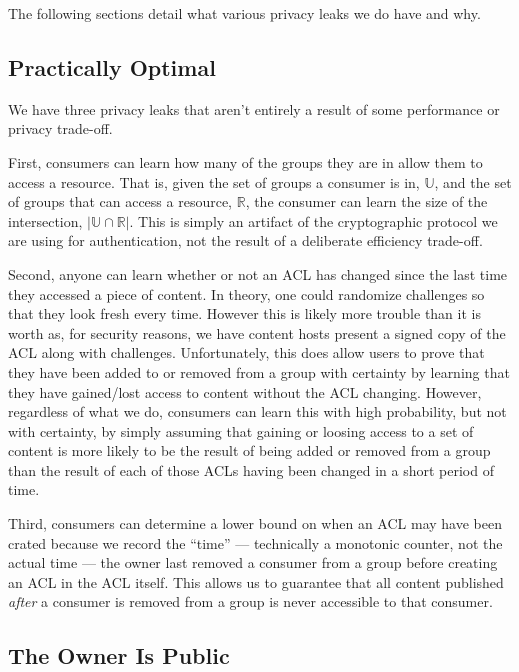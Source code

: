 \documentclass[pdftex,12pt,a4papaer]{report}
\begin{document}
The following sections detail what various privacy leaks we do have and why.

\subsection{Practically Optimal}
\label{sub:practically_optimal}

We have three privacy leaks that aren't entirely a result of some performance or
privacy trade-off.

First, consumers can learn how many of the groups they are in allow them to
access a resource. That is, given the set of groups a consumer is in,
$\mathbb{U}$, and the set of groups that can access a resource, $\mathbb{R}$,
the consumer can learn the size of the intersection, $|\mathbb{U} \cap
\mathbb{R}|$. This is simply an artifact of the cryptographic protocol we are
using for authentication, not the result of a deliberate efficiency trade-off.

Second, anyone can learn whether or not an ACL has changed since the last time
they accessed a piece of content. In theory, one could randomize challenges so
that they look fresh every time. However this is likely more trouble
than it is worth as, for security reasons, we have content hosts present a
signed copy of the ACL along with challenges. Unfortunately, this does allow
users to prove that they have been added to or removed from a group with
certainty by learning that they have gained/lost access to content without the
ACL changing. However, regardless of what we do, consumers can learn this with
high probability, but not with certainty, by simply assuming that gaining or
loosing access to a set of content is more likely to be the result of being
added or removed from a group than the result of each of those ACLs having been
changed in a short period of time.

Third, consumers can determine a lower bound on when an ACL may have been crated
because we record the ``time'' --- technically a monotonic counter, not the
actual time --- the owner last removed a consumer from a group before creating
an ACL in the ACL itself. This allows us to guarantee that all content published
\emph{after} a consumer is removed from a group is never accessible to that
consumer.

\subsection{The Owner Is Public}
\end{document}

